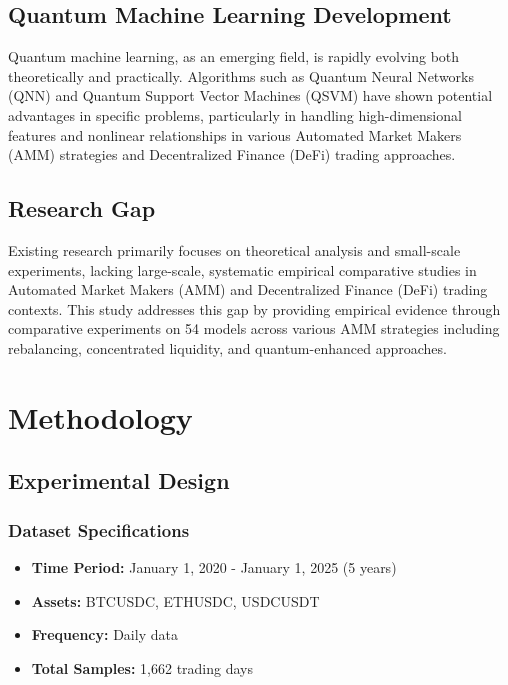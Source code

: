 \documentclass[12pt,a4paper]{article}
\begin{document}
\subsection{Quantum Machine Learning Development}

Quantum machine learning, as an emerging field, is rapidly evolving both theoretically and practically. Algorithms such as Quantum Neural Networks (QNN) and Quantum Support Vector Machines (QSVM) have shown potential advantages in specific problems, particularly in handling high-dimensional features and nonlinear relationships in various Automated Market Makers (AMM) strategies and Decentralized Finance (DeFi) trading approaches.

\subsection{Research Gap}

Existing research primarily focuses on theoretical analysis and small-scale experiments, lacking large-scale, systematic empirical comparative studies in Automated Market Makers (AMM) and Decentralized Finance (DeFi) trading contexts. This study addresses this gap by providing empirical evidence through comparative experiments on 54 models across various AMM strategies including rebalancing, concentrated liquidity, and quantum-enhanced approaches.

\section{Methodology}

\subsection{Experimental Design}

\subsubsection{Dataset Specifications}
\begin{itemize}
    \item \textbf{Time Period:} January 1, 2020 - January 1, 2025 (5 years)
    \item \textbf{Assets:} BTCUSDC, ETHUSDC, USDCUSDT
    \item \textbf{Frequency:} Daily data
    \item \textbf{Total Samples:} 1,662 trading days
\end{itemize}
\end{document}

